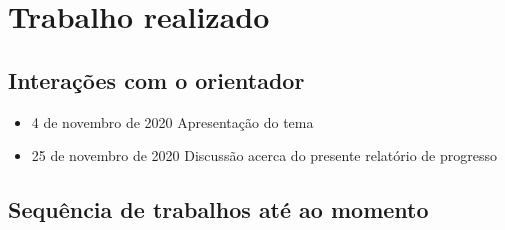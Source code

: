 \section{Trabalho realizado}\label{sec:trabalho}

\subsection{Interações com o orientador}\label{sec:interacoes}
\begin{itemize}
 \item 4 de novembro de 2020
    \subitem Apresentação do tema
 \item 25 de novembro de 2020
    \subitem Discussão acerca do presente relatório de progresso
\end{itemize}



\subsection{Sequência de trabalhos até ao momento}\label{sec:seq_trabalhos}
